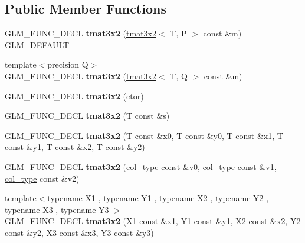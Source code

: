 \subsection*{Public Member Functions}
\begin{DoxyCompactItemize}
\item 
\hypertarget{structglm_1_1tmat3x2_a654f76d38f00d3c005a9bddb23200c2e}{G\-L\-M\-\_\-\-F\-U\-N\-C\-\_\-\-D\-E\-C\-L {\bfseries tmat3x2} (\hyperlink{structglm_1_1tmat3x2}{tmat3x2}$<$ T, P $>$ const \&m) G\-L\-M\-\_\-\-D\-E\-F\-A\-U\-L\-T}\label{structglm_1_1tmat3x2_a654f76d38f00d3c005a9bddb23200c2e}

\item 
\hypertarget{structglm_1_1tmat3x2_a238eaf8178ff26a8c6adb554790043ee}{{\footnotesize template$<$precision Q$>$ }\\G\-L\-M\-\_\-\-F\-U\-N\-C\-\_\-\-D\-E\-C\-L {\bfseries tmat3x2} (\hyperlink{structglm_1_1tmat3x2}{tmat3x2}$<$ T, Q $>$ const \&m)}\label{structglm_1_1tmat3x2_a238eaf8178ff26a8c6adb554790043ee}

\item 
\hypertarget{structglm_1_1tmat3x2_a0f9e6dcf7a7c609cdcbab92ab25e5f04}{G\-L\-M\-\_\-\-F\-U\-N\-C\-\_\-\-D\-E\-C\-L {\bfseries tmat3x2} (ctor)}\label{structglm_1_1tmat3x2_a0f9e6dcf7a7c609cdcbab92ab25e5f04}

\item 
\hypertarget{structglm_1_1tmat3x2_acf77469d781a1bd7ba7776529a368606}{G\-L\-M\-\_\-\-F\-U\-N\-C\-\_\-\-D\-E\-C\-L {\bfseries tmat3x2} (T const \&s)}\label{structglm_1_1tmat3x2_acf77469d781a1bd7ba7776529a368606}

\item 
\hypertarget{structglm_1_1tmat3x2_a7fdab6666703ca387261512b30420d1b}{G\-L\-M\-\_\-\-F\-U\-N\-C\-\_\-\-D\-E\-C\-L {\bfseries tmat3x2} (T const \&x0, T const \&y0, T const \&x1, T const \&y1, T const \&x2, T const \&y2)}\label{structglm_1_1tmat3x2_a7fdab6666703ca387261512b30420d1b}

\item 
\hypertarget{structglm_1_1tmat3x2_a59846d49680c29a955f14158d32f23b9}{G\-L\-M\-\_\-\-F\-U\-N\-C\-\_\-\-D\-E\-C\-L {\bfseries tmat3x2} (\hyperlink{structglm_1_1tvec2}{col\-\_\-type} const \&v0, \hyperlink{structglm_1_1tvec2}{col\-\_\-type} const \&v1, \hyperlink{structglm_1_1tvec2}{col\-\_\-type} const \&v2)}\label{structglm_1_1tmat3x2_a59846d49680c29a955f14158d32f23b9}

\item 
\hypertarget{structglm_1_1tmat3x2_a26c711383636c9d9cb72a52569f3b94f}{{\footnotesize template$<$typename X1 , typename Y1 , typename X2 , typename Y2 , typename X3 , typename Y3 $>$ }\\G\-L\-M\-\_\-\-F\-U\-N\-C\-\_\-\-D\-E\-C\-L {\bfseries tmat3x2} (X1 const \&x1, Y1 const \&y1, X2 const \&x2, Y2 const \&y2, X3 const \&x3, Y3 const \&y3)}\label{structglm_1_1tmat3x2_a26c711383636c9d9cb72a52569f3b94f}


\end{DoxyCompactItemize}

